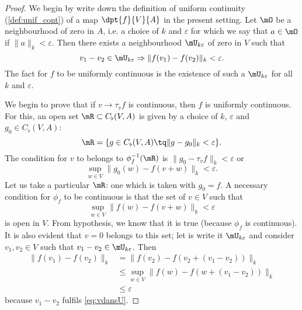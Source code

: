 \begin{proof}
We begin by write down the definition of uniform continuity (\ref{def:unif_cont}) of a map $\dpt{f}{V}{A}$ in the present setting. Let $\mO$ be a neighbourhood of zero in $A$, i.e. a choice of $k$ and $\varepsilon$ for which we say that $a\in\mO$ if $\| a \|_k<\varepsilon$. Then there exists a neighbourhood $\mU_{k\varepsilon}$ of zero in $V$ such that 
\begin{equation}
v_1-v_2\in\mU_{k\varepsilon}\Rightarrow \| f(v_1)-f(v_2) \|_k<\varepsilon.
\end{equation}
The fact for $f$ to be uniformly continuous is the existence of such a $\mU_{k\varepsilon}$ for all $k$ and $\varepsilon$. 

We begin to prove that if $v\to\tau_vf$ is continuous, then $f$ is uniformly continuous.  For this, an open set $\mR\subset C_{\flat}(V,A)$ is given by a choice of $k$, $\varepsilon$ and $g_0\in C_{\flat}(V,A)$:
\begin{equation}
   \mR=\{ g\in C_{\flat}(V,A)\tq \| g-g_0 \|_k< \varepsilon  \}.
\end{equation}
The condition for $v$ to belongs to $\phi_f^{-1}(\mR)$ is $\| g_0-\tau_vf \|_k<\varepsilon$ or
\begin{equation}
  \sup_{w\in V}\| g_0(w)-f(v+w) \|_k<\varepsilon.
\end{equation}
Let us take a particular $\mR$: one which is taken with $g_0=f$. A necessary condition for $\phi_f$ to be continuous is that the set of $v\in V$ such that
\begin{equation} \label{eq:vdansU}
  \sup_{w\in V}\| f(w)-f(v+w) \|_k<\varepsilon
\end{equation}
is open in $V$. From hypothesis, we know that it is true (because $\phi_f$ is continuous). It is also evident that $v=0$ belongs to this set; let is write it $\mU_{k\varepsilon}$ and consider $v_1,v_2\in V$ such that $v_1-v_2\in\mU_{k\varepsilon}$. Then
\begin{equation}
\begin{split}
  \| f(v_1)-f(v_2) \|_k&=\| f(v_2)-f(v_2+(v_1-v_2)) \|_k\\
                       &\leq \sup_{w\in V}\| f(w)-f(w+(v_1-v_2)) \|_k\\
                       &\leq \varepsilon
\end{split}
\end{equation}
because $v_1-v_2$ fulfils \eqref{eq:vdansU}.


\end{proof}

